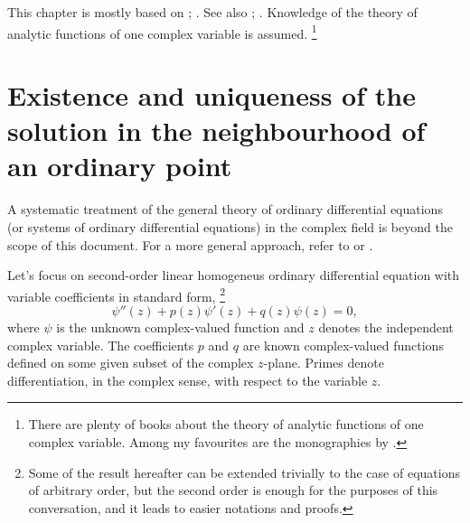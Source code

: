 This chapter is mostly based on \textcite[\S~V]{Tricomi:1961};
\textcite[\S~2]{Wang.Guo:1989}. See also \textcite[\S~V]{Smirnov:1964};
\textcite[\S~X]{Whittaker.Watson:1927}.  Knowledge of
the theory of analytic functions of one complex variable is assumed.%
\footnote{%
   There are plenty of books about the theory of analytic functions of one complex
   variable.  Among my favourites are the monographies by
   \textcite{Ablowitz.Fokas:2003,Stein.Shakarchi:2003,Marsden.Hoffman:1987,Greene.Krantz:2006}.}



\section[Solution in the neighbourhood of an ordinary point]{Existence and
   uniqueness of the solution in the neighbourhood of an ordinary
   point}\label{sec:existence}


A systematic treatment of the general theory of ordinary differential
equations (or systems of ordinary differential equations) in the complex field
is beyond the scope of this document. For a more general approach, refer to
\textcite{Tricomi:1961}
or \textcite{Ince:1956}.


Let's  
   focus  on second-order 
   linear homogeneus
ordinary differential equation with variable coefficients in standard form,%
\footnote{%
   Some of the result hereafter can be extended trivially 
   to the case of equations of arbitrary order, but
   the second order is enough for the purposes of this conversation, and it leads to easier
   notations and proofs. 
}
\begin{dmath}[label={ode}]
   \psi'' (z) + p(z) \psi'(z) + q(z) \psi(z) = 0 ,
\end{dmath}
where $\psi$ is the unknown complex-valued function and $z$ denotes the
independent complex variable. The coefficients $p$ and $q$ are known
complex-valued functions defined on some given subset of the complex $z$-plane.
Primes denote differentiation, in the complex sense,
with respect to the variable $z$.

